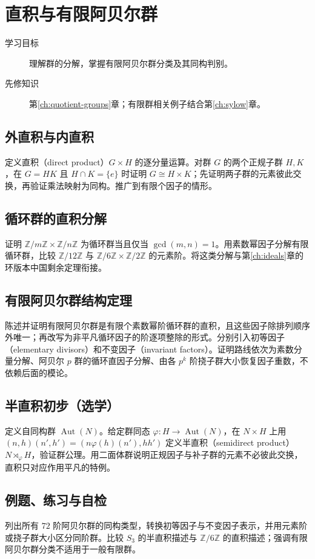 \setcounter{chapter}{7} %
\chapter{直积与有限阿贝尔群}\label{ch:abelian}

\begin{description}
  \item[学习目标] 理解群的分解，掌握有限阿贝尔群分类及其同构判别。
  \item[先修知识] 第\ref{ch:quotient-groups}章；有限群相关例子结合第\ref{ch:sylow}章。
\end{description}

\section{外直积与内直积}
定义直积（direct product）$G\times H$ 的逐分量运算。对群 $G$ 的两个正规子群 $H,K$，在 $G=HK$ 且 $H\cap K=\{e\}$ 时证明 $G\cong H\times K$；先证明两子群的元素彼此交换，再验证乘法映射为同构。推广到有限个因子的情形。

\section{循环群的直积分解}
证明 $\mathbb Z/m\mathbb Z\times\mathbb Z/n\mathbb Z$ 为循环群当且仅当 $\gcd(m,n)=1$。用素数幂因子分解有限循环群，比较 $\mathbb Z/12\mathbb Z$ 与 $\mathbb Z/6\mathbb Z\times\mathbb Z/2\mathbb Z$ 的元素阶。将这类分解与第\ref{ch:ideals}章的环版本中国剩余定理衔接。

\section{有限阿贝尔群结构定理}
陈述并证明有限阿贝尔群是有限个素数幂阶循环群的直积，且这些因子除排列顺序外唯一；再改写为非平凡循环因子的阶逐项整除的形式。分别引入初等因子（elementary divisors）和不变因子（invariant factors）。证明路线依次为素数分量分解、阿贝尔 $p$ 群的循环直因子分解、由各 $p^k$ 阶挠子群大小恢复因子重数，不依赖后面的模论。

\section{半直积初步（选学）}
定义自同构群 $\operatorname{Aut}(N)$。给定群同态 $\varphi:H\to\operatorname{Aut}(N)$，在 $N\times H$ 上用 $(n,h)(n',h')=(n\varphi(h)(n'),hh')$ 定义半直积（semidirect product）$N\rtimes_\varphi H$，验证群公理。用二面体群说明正规因子与补子群的元素不必彼此交换，直积只对应作用平凡的特例。

\section{例题、练习与自检}
列出所有 $72$ 阶阿贝尔群的同构类型，转换初等因子与不变因子表示，并用元素阶或挠子群大小区分同阶群。比较 $S_3$ 的半直积描述与 $\mathbb Z/6\mathbb Z$ 的直积描述；强调有限阿贝尔群分类不适用于一般有限群。

